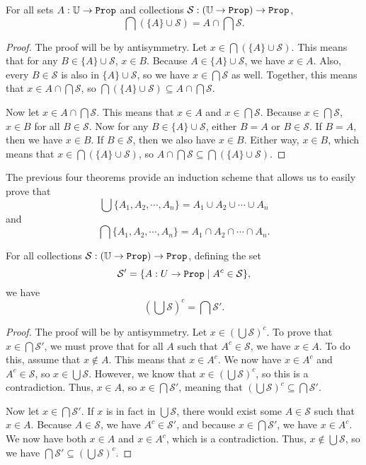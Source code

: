 \documentclass[../../math.tex]{subfiles}
\begin{document}
\begin{theorem}
    For all sets $A : \U \rightarrow \Prop$ and collections $\mathcal S : (\U
    \rightarrow \Prop) \rightarrow \Prop$,
    \[
        \bigcap (\{A\} \cup \mathcal S) = A \cap \bigcap \mathcal S.
    \]
\end{theorem}
\begin{proof}
    The proof will be by antisymmetry.  Let $x \in \bigcap (\{A\} \cup \mathcal
    S)$.  This means that for any $B \in \{A\} \cup \mathcal S$, $x \in B$.
    Because $A \in \{A\} \cup \mathcal S$, we have $x \in A$.  Also, every $B
    \in \mathcal S$ is also in $\{A\} \cup \mathcal S$, so we have $x \in
    \bigcap \mathcal S$ as well.  Together, this means that $x \in A \cap
    \bigcap \mathcal S$, so $\bigcap (\{A\} \cup \mathcal S) \subseteq A \cap
    \bigcap \mathcal S$.

    Now let $x \in A \cap \bigcap \mathcal S$.  This means that $x \in A$ and $x
    \in \bigcap \mathcal S$.  Because $x \in \bigcap \mathcal S$, $x \in B$ for
    all $B \in \mathcal S$.  Now for any $B \in \{A\} \cup \mathcal S$, either
    $B = A$ or $B \in \mathcal S$.  If $B = A$, then we have $x \in B$.  If $B
    \in \mathcal S$, then we also have $x \in B$.  Either way, $x \in B$, which
    means that $x \in \bigcap (\{A\} \cup \mathcal S)$, so $A \cap \bigcap
    \mathcal S \subseteq \bigcap (\{A\} \cup \mathcal S)$.
\end{proof}

The previous four theorems provide an induction scheme that allows us to easily
prove that
\[
    \bigcup \{A_1, A_2, \cdots, A_n\} = A_1 \cup A_2 \cup \cdots \cup A_n
\]
and
\[
    \bigcap \{A_1, A_2, \cdots, A_n\} = A_1 \cap A_2 \cap \cdots \cap A_n.
\]

\begin{theorem}
    For all collections $\mathcal S : \col \U$, defining the set
    \[
        \mathcal S' = \{A : \set U \mid A^c \in \mathcal S\},
    \]
    we have
    \[
        \left( \bigcup \mathcal S \right)^c = \bigcap \mathcal S'.
    \]
\end{theorem}
\begin{proof}
    The proof will be by antisymmetry.  Let $x \in (\bigcup \mathcal S)^c$.  To
    prove that $x \in \bigcap \mathcal S'$, we must prove that for all $A$ such
    that $A^c \in \mathcal S$, we have $x \in A$.  To do this, assume that $x
    \notin A$.  This means that $x \in A^c$.  We now have $x \in A^c$ and $A^c
    \in \mathcal S$, so $x \in \bigcup \mathcal S$.  However, we know that $x
    \in (\bigcup \mathcal S)^c$, so this is a contradiction.  Thus, $x \in A$,
    so $x \in \bigcap \mathcal S'$, meaning that $(\bigcup \mathcal S)^c
    \subseteq \bigcap \mathcal S'$.

    Now let $x \in \bigcap \mathcal S'$.  If $x$ is in fact in $\bigcup \mathcal
    S$, there would exist some $A \in \mathcal S$ such that $x \in A$.  Because
    $A \in \mathcal S$, we have $A^c \in \mathcal S'$, and because $x \in
    \bigcap \mathcal S'$, we have $x \in A^c$.  We now have both $x \in A$ and
    $x \in A^c$, which is a contradiction.  Thus, $x \notin \bigcup \mathcal S$,
    so we have $\bigcap \mathcal S' \subseteq (\bigcup \mathcal S)^c$.
\end{proof}
\end{document}
